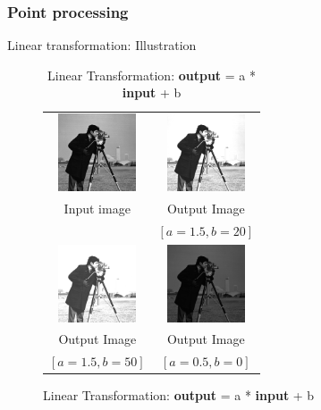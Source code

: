 \documentclass[english,11pt,table,handout]{beamer}
\begin{document}
\begin{frame}[fragile]
	\frametitle{Point processing}
	\begin{block}{Linear transformation: Illustration}
	\begin{figure}[!h]
		\begin{table}
		\begin{tabular}{cc}
			\includegraphics[width=2.3cm]{./images/cameraman.png} & \includegraphics[width=2.3cm]{./images/cameraman1.png} \\
			Input image & Output Image \\
			 & $[a=1.5, b=20]$ \\
			\includegraphics[width=2.3cm]{./images/cameraman2.png} &
			 \includegraphics[width=2.3cm]{./images/cameraman3.png} \\
			 Output Image  & Output Image \\
			 $[a=1.5, b=50]$ & $[a=0.5, b=0]$ 
			 
		\end{tabular}
		\caption{Linear Transformation: \textbf{output} = a * \textbf{input} + b}
		\end{table}
	\end{figure}	
	\end{block}
\end{frame}
\end{document}
